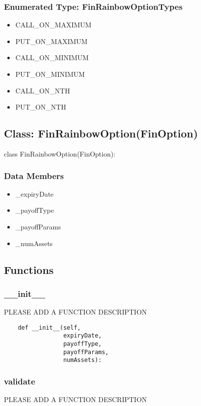 \documentclass[twoside,11pt]{book}
\begin{document}
\subsubsection{Enumerated Type: FinRainbowOptionTypes}
\begin{itemize}
\item{CALL\_ON\_MAXIMUM}
\item{PUT\_ON\_MAXIMUM}
\item{CALL\_ON\_MINIMUM}
\item{PUT\_ON\_MINIMUM}
\item{CALL\_ON\_NTH}
\item{PUT\_ON\_NTH}
\end{itemize}

\subsection*{Class: FinRainbowOption(FinOption)}
class FinRainbowOption(FinOption): 

\subsubsection*{Data Members}
\begin{itemize}
\item{\_expiryDate}
\item{\_payoffType}
\item{\_payoffParams}
\item{\_numAssets}
\end{itemize}

\subsection*{Functions}

\subsubsection*{{\bf \_\_init\_\_}}
PLEASE ADD A FUNCTION DESCRIPTION

\begin{lstlisting}
    def __init__(self,
                 expiryDate,
                 payoffType,
                 payoffParams,
                 numAssets):
\end{lstlisting}

\subsubsection*{{\bf validate}}
PLEASE ADD A FUNCTION DESCRIPTION
\end{document}
